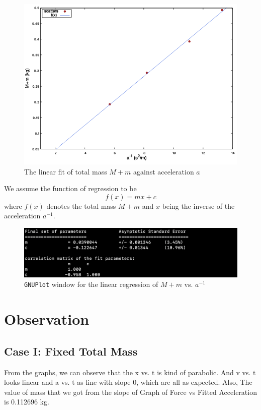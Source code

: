 \documentclass[11pt, a4paper, abstract=true]{scrartcl}
\begin{document}
\newpage
\begin{figure}[H]
    \centering
    \includegraphics[scale=0.65]{assets/fixedforce_fit.png}
    \caption{The linear fit of total mass \(M + m\) against acceleration \(a\)}
    \label{fig:fig11}
\end{figure}
\begin{algorithm}
    We assume the function of regression to be \[f(x) = mx + c\] where \(f(x)\) denotes the total mass \(M + m\) and \(x\) being the inverse of the acceleration \(a^{-1}\).
\end{algorithm}
\begin{figure}[H]
    \centering
    \includegraphics[scale=0.55]{assets/gnuplot_shots/fit2.png}
    \caption{\texttt{GNUPlot} window for the linear regression of \(M+m\) vs. \(a^{-1}\)}
\end{figure}

\newpage

\section{Observation}
\subsection{Case I: Fixed Total Mass}
From the graphs, we can observe that the x vs. t is kind of parabolic. And v vs. t looks linear and a vs. t as line with slope 0, which are all as expected. Also, The value of mass that we got from the slope of Graph of Force vs Fitted Acceleration is 0.112696 kg.
\end{document}
